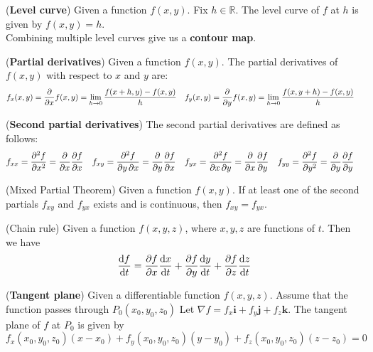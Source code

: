 \documentclass{huhtakm-template-book}
\begin{document}
\begin{defn}(\textbf{Level curve})
    Given a function $f(x,y)$.
    Fix $h\in\mathbb{R}$. The level curve of $f$ at $h$ is given by $f(x,y)=h$.\\
    Combining multiple level curves give us a \textbf{contour map}.
\end{defn}
\begin{defn}(\textbf{Partial derivatives})
    Given a function $f(x,y)$. The partial derivatives of $f(x,y)$ with respect to $x$ and $y$ are:
    \begin{align*}
        f_{x}(x,y)=\pdv*{f(x,y)}{x}&=\lim_{h\to 0}\frac{f(x+h,y)-f(x,y)}{h} & f_{y}(x,y)=\pdv*{f(x,y)}{y}&=\lim_{h\to 0}\frac{f(x,y+h)-f(x,y)}{h}
    \end{align*}
\end{defn}
\begin{defn}(\textbf{Second partial derivatives})
    The second partial derivatives are defined as follows:
    \begin{align*}
        f_{xx}&=\pdv[order={2}]{f}{x}=\pdv*{\pdv{f}{x}}{x} & f_{xy}&=\pdv{f}{y,x}=\pdv*{\pdv{f}{x}}{y} & f_{yx}&=\pdv{f}{x,y}=\pdv*{\pdv{f}{y}}{x} & f_{yy}&=\pdv[order={2}]{f}{y}=\pdv*{\pdv{f}{y}}{y}
    \end{align*}
\end{defn}
\begin{thm}(Mixed Partial Theorem)
    Given a function $f(x,y)$. If at least one of the second partials $f_{xy}$ and $f_{yx}$ exists and is continuous, then $f_{xy}=f_{yx}$.
\end{thm}
\begin{lem}(Chain rule)
    Given a function $f(x,y,z)$, where $x,y,z$ are functions of $t$. Then we have
    \begin{equation*}
        \odv{f}{t}=\pdv{f}{x}\odv{x}{t}+\pdv{f}{y}\odv{y}{t}+\pdv{f}{z}\odv{z}{t}
    \end{equation*}
\end{lem}
\begin{defn}(\textbf{Tangent plane})
    Given a differentiable function $f(x,y,z)$. Assume that the function passes through $P_{0}(x_{0},y_{0},z_{0})$ Let $\nabla f=f_{x}\mathbf{i}+f_{y}\mathbf{j}+f_{z}\mathbf{k}$. The tangent plane of $f$ at $P_{0}$ is given by
    \begin{equation*}
        f_{x}(x_{0},y_{0},z_{0})(x-x_{0})+f_{y}(x_{0},y_{0},z_{0})(y-y_{0})+f_{z}(x_{0},y_{0},z_{0})(z-z_{0})=0
    \end{equation*}
\end{defn}
\end{document}
